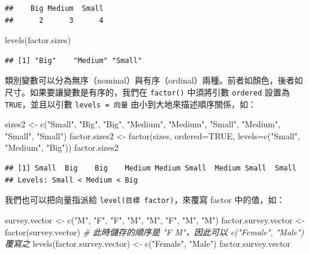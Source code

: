 \documentclass[
]{book}
\newenvironment{Shaded}{\begin{snugshade}}{\end{snugshade}}
\newcommand{\AttributeTok}[1]{\textcolor[rgb]{0.77,0.63,0.00}{#1}}
\newcommand{\CommentTok}[1]{\textcolor[rgb]{0.56,0.35,0.01}{\textit{#1}}}
\newcommand{\ConstantTok}[1]{\textcolor[rgb]{0.00,0.00,0.00}{#1}}
\newcommand{\FunctionTok}[1]{\textcolor[rgb]{0.00,0.00,0.00}{#1}}
\newcommand{\NormalTok}[1]{#1}
\newcommand{\OtherTok}[1]{\textcolor[rgb]{0.56,0.35,0.01}{#1}}
\newcommand{\StringTok}[1]{\textcolor[rgb]{0.31,0.60,0.02}{#1}}
\theoremstyle{definition}
\theoremstyle{remark}
\begin{document}
\begin{verbatim}
##    Big Medium  Small 
##      2      3      4
\end{verbatim}

\begin{Shaded}
\begin{Highlighting}[]
\FunctionTok{levels}\NormalTok{(factor.sizes)}
\end{Highlighting}
\end{Shaded}

\begin{verbatim}
## [1] "Big"    "Medium" "Small"
\end{verbatim}

類別變數可以分為無序（nominal）與有序（ordinal）兩種。前者如顏色，後者如尺寸。如果要讓變數是有序的，我們在 \texttt{factor()} 中須將引數 \texttt{ordered} 設置為 \texttt{TRUE}，並且以引數 \texttt{levels\ =\ 向量} 由小到大地來描述順序關係，如：

\begin{Shaded}
\begin{Highlighting}[]
\NormalTok{sizes2 }\OtherTok{\textless{}{-}} \FunctionTok{c}\NormalTok{(}\StringTok{"Small"}\NormalTok{, }\StringTok{"Big"}\NormalTok{, }\StringTok{"Big"}\NormalTok{, }\StringTok{"Medium"}\NormalTok{, }\StringTok{"Medium"}\NormalTok{, }\StringTok{"Small"}\NormalTok{, }\StringTok{"Medium"}\NormalTok{, }\StringTok{"Small"}\NormalTok{, }\StringTok{"Small"}\NormalTok{)}
\NormalTok{factor.sizes2 }\OtherTok{\textless{}{-}} \FunctionTok{factor}\NormalTok{(sizes, }\AttributeTok{ordered=}\ConstantTok{TRUE}\NormalTok{, }\AttributeTok{levels=}\FunctionTok{c}\NormalTok{(}\StringTok{"Small"}\NormalTok{, }\StringTok{"Medium"}\NormalTok{, }\StringTok{"Big"}\NormalTok{))}
\NormalTok{factor.sizes2}
\end{Highlighting}
\end{Shaded}

\begin{verbatim}
## [1] Small  Big    Big    Medium Medium Small  Medium Small  Small 
## Levels: Small < Medium < Big
\end{verbatim}

我們也可以把向量指派給 \texttt{level(目標\ factor)}，來覆寫 factor 中的值，如：

\begin{Shaded}
\begin{Highlighting}[]
\NormalTok{survey.vector }\OtherTok{\textless{}{-}} \FunctionTok{c}\NormalTok{(}\StringTok{"M"}\NormalTok{, }\StringTok{"F"}\NormalTok{, }\StringTok{"F"}\NormalTok{, }\StringTok{"M"}\NormalTok{, }\StringTok{"M"}\NormalTok{, }\StringTok{"F"}\NormalTok{, }\StringTok{"M"}\NormalTok{, }\StringTok{"M"}\NormalTok{) }
\NormalTok{factor.survey.vector }\OtherTok{\textless{}{-}} \FunctionTok{factor}\NormalTok{(survey.vector)}
\CommentTok{\# 此時儲存的順序是 "F M"，因此可以 c("Female", "Male") 覆寫之}
\FunctionTok{levels}\NormalTok{(factor.survey.vector) }\OtherTok{\textless{}{-}} \FunctionTok{c}\NormalTok{(}\StringTok{"Female"}\NormalTok{, }\StringTok{"Male"}\NormalTok{)}
\NormalTok{factor.survey.vector}
\end{Highlighting}
\end{Shaded}
\end{document}
